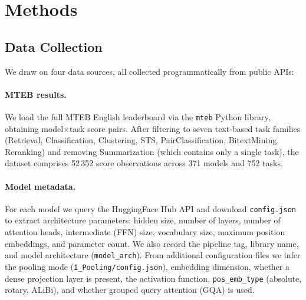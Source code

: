 \documentclass[11pt,a4paper,twocolumn]{article}
\begin{document}
\section{Methods}
\label{sec:methods}

\subsection{Data Collection}

We draw on four data sources, all collected programmatically from public APIs:

\paragraph{MTEB results.}
We load the full MTEB English leaderboard via the \texttt{mteb} Python library, obtaining model$\times$task score pairs.
After filtering to seven text-based task families (Retrieval, Classification, Clustering, STS, PairClassification, BitextMining, Reranking) and removing Summarization (which contains only a single task), the dataset comprises 52\,352 score observations across 371 models and 752 tasks.

\paragraph{Model metadata.}
For each model we query the HuggingFace Hub API and download \texttt{config.json} to extract architecture parameters: hidden size, number of layers, number of attention heads, intermediate (FFN) size, vocabulary size, maximum position embeddings, and parameter count.
We also record the pipeline tag, library name, and model architecture (\texttt{model\_arch}).
From additional configuration files we infer the pooling mode (\texttt{1\_Pooling/config.json}), embedding dimension, whether a dense projection layer is present, the activation function, \texttt{pos\_emb\_type} (absolute, rotary, ALiBi), and whether grouped query attention (GQA) is used.
\end{document}
